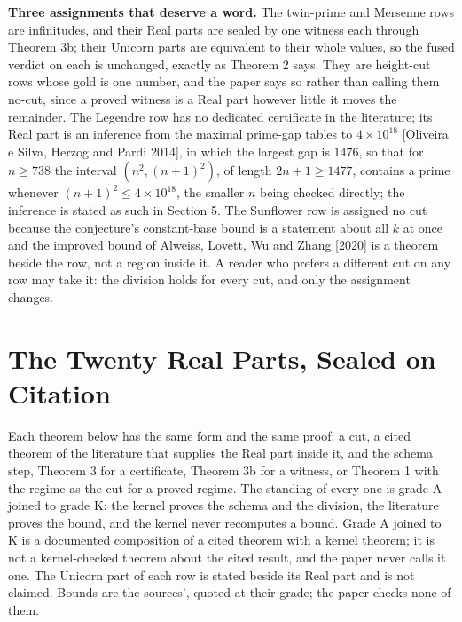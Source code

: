 \documentclass[10pt]{article}
\begin{document}
\textbf{Three assignments that deserve a word.} The twin-prime and
Mersenne rows are infinitudes, and their Real parts are sealed by one
witness each through Theorem 3b; their Unicorn parts are equivalent to
their whole values, so the fused verdict on each is unchanged, exactly
as Theorem 2 says. They are height-cut rows whose gold is one number,
and the paper says so rather than calling them no-cut, since a proved
witness is a Real part however little it moves the remainder. The
Legendre row has no dedicated certificate in the literature; its Real
part is an inference from the maximal prime-gap tables to
\(4 \times 10^{18}\) {[}Oliveira e Silva, Herzog and Pardi 2014{]}, in
which the largest gap is \(1476\), so that for \(n \ge 738\) the
interval \((n^2, (n+1)^2)\), of length \(2n+1 \ge 1477\), contains a
prime whenever \((n+1)^2 \le 4 \times 10^{18}\), the smaller \(n\) being
checked directly; the inference is stated as such in Section 5. The
Sunflower row is assigned no cut because the conjecture's constant-base
bound is a statement about all \(k\) at once and the improved bound of
Alweiss, Lovett, Wu and Zhang {[}2020{]} is a theorem beside the row,
not a region inside it. A reader who prefers a different cut on any row
may take it: the division holds for every cut, and only the assignment
changes.

\hypertarget{the-twenty-real-parts-sealed-on-citation}{%
\section{The Twenty Real Parts, Sealed on
Citation}\label{the-twenty-real-parts-sealed-on-citation}}

Each theorem below has the same form and the same proof: a cut, a cited
theorem of the literature that supplies the Real part inside it, and the
schema step, Theorem 3 for a certificate, Theorem 3b for a witness, or
Theorem 1 with the regime as the cut for a proved regime. The standing
of every one is grade A joined to grade K: the kernel proves the schema
and the division, the literature proves the bound, and the kernel never
recomputes a bound. Grade A joined to K is a documented composition of a
cited theorem with a kernel theorem; it is not a kernel-checked theorem
about the cited result, and the paper never calls it one. The Unicorn
part of each row is stated beside its Real part and is not claimed.
Bounds are the sources', quoted at their grade; the paper checks none of
them.
\end{document}
